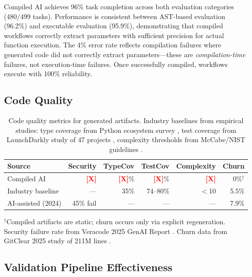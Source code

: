 \documentclass[11pt]{article}
\newcommand{\placeholder}[1]{\textcolor{red}{\textbf{[#1]}}}
\begin{document}
Compiled AI achieves 96\% task completion across both evaluation categories (480/499 tasks). Performance is consistent between AST-based evaluation (96.2\%) and executable evaluation (95.9\%), demonstrating that compiled workflows correctly extract parameters with sufficient precision for actual function execution. The 4\% error rate reflects compilation failures where generated code did not correctly extract parameters—these are \textit{compilation-time} failures, not execution-time failures. Once successfully compiled, workflows execute with 100\% reliability.

\subsection{Code Quality}

\begin{table}[ht]
\centering
\caption{Code quality metrics for generated artifacts. Industry baselines from empirical studies: type coverage from Python ecosystem survey \citep{pythontypecoverage2024}, test coverage from LaunchDarkly study of 47 projects \citep{launchdarkly2019}, complexity thresholds from McCabe/NIST guidelines \citep{mccabe1976}.}
\label{tab:quality-results}
\begin{tabular}{lrrrrr}
\toprule
Source & Security & TypeCov & TestCov & Complexity & Churn \\
\midrule
Compiled AI & \placeholder{X} & \placeholder{X}\% & \placeholder{X}\% & \placeholder{X} & 0\%$^\dagger$ \\
Industry baseline & --- & 35\% & 74--80\% & $<$10 & 5.5\% \\
AI-assisted (2024) & 45\% fail & --- & --- & --- & 7.9\% \\
\bottomrule
\end{tabular}
\begin{flushleft}
\scriptsize{$^\dagger$Compiled artifacts are static; churn occurs only via explicit regeneration.\\
Security failure rate from Veracode 2025 GenAI Report \citep{veracode2025genai}. Churn data from GitClear 2025 study of 211M lines \citep{gitclear2025}.}
\end{flushleft}
\end{table}

\subsection{Validation Pipeline Effectiveness}
\end{document}

